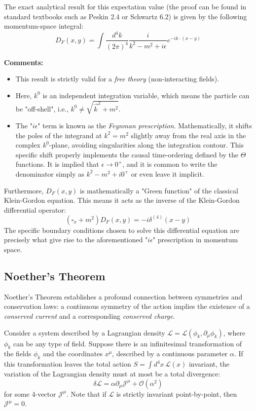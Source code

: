 The exact analytical result for this expectation value (the proof can be found in standard textbooks such as Peskin 2.4 or Schwartz 6.2) is given by the following momentum-space integral:
\[
    D_F(x, y) = \int \frac{d^4k}{(2\pi)^4} \frac{i}{k^2 - m^2 + i\epsilon} e^{-ik \cdot (x - y)}
\]

\textbf{Comments:}
\begin{itemize}
    \item This result is strictly valid for a \textit{free theory} (non-interacting fields).
    \item Here, $k^0$ is an independent integration variable, which means the particle can be "off-shell", i.e., $k^0 \neq \sqrt{\vec{k}^2 + m^2}$.
    \item The "$i\epsilon$" term is known as the \textit{Feynman prescription}. Mathematically, it shifts the poles of the integrand at $k^2 = m^2$ slightly away from the real axis in the complex $k^0$-plane, avoiding singularities along the integration contour. This specific shift properly implements the causal time-ordering defined by the $\Theta$ functions. It is implied that $\epsilon \to 0^+$, and it is common to write the denominator simply as $k^2 - m^2 + i0^+$ or even leave it implicit.
\end{itemize}

Furthermore, $D_F(x, y)$ is mathematically a "Green function" of the classical Klein-Gordon equation. This means it acts as the inverse of the Klein-Gordon differential operator:
\[
    (\square_x + m^2) D_F(x, y) = -i \delta^{(4)}(x - y)
\]
The specific boundary conditions chosen to solve this differential equation are precisely what give rise to the aforementioned "$i\epsilon$" prescription in momentum space.


\subsection{Noether's Theorem}

Noether's Theorem establishes a profound connection between symmetries and conservation laws: a continuous symmetry of the action implies the existence of a \textit{conserved current} and a corresponding \textit{conserved charge}.

Consider a system described by a Lagrangian density $\mathcal{L} = \mathcal{L}(\phi_k, \partial_\mu \phi_k)$, where $\phi_k$ can be any type of field. Suppose there is an infinitesimal transformation of the fields $\phi_k$ and the coordinates $x^\mu$, described by a continuous parameter $\alpha$. If this transformation leaves the total action $S = \int d^4x \, \mathcal{L}(x)$ invariant, the variation of the Lagrangian density must at most be a total divergence:
\[
    \delta \mathcal{L} = \alpha \partial_\mu \mathcal{J}^\mu + \mathcal{O}(\alpha^2)
\]
for some 4-vector $\mathcal{J}^\mu$. Note that if $\mathcal{L}$ is strictly invariant point-by-point, then $\mathcal{J}^\mu = 0$.

